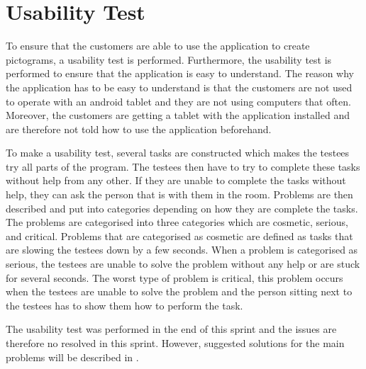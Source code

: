 \section{Usability Test}\label{sec:usability-test}
To ensure that the customers are able to use the application to create pictograms, a usability test is performed.
Furthermore, the usability test is performed to ensure that the application is easy to understand.
The reason why the application has to be easy to understand is that the customers are not used to operate with an android tablet and they are not using computers that often.
Moreover, the customers are getting a tablet with the application installed and are therefore not told how to use the application beforehand.

To make a usability test, several tasks are constructed which makes the testees try all parts of the program. 
The testees then have to try to complete these tasks without help from any other.
If they are unable to complete the tasks without help, they can ask the person that is with them in the room.
Problems are then described and put into categories depending on how they are complete the tasks.
The problems are categorised into three categories which are cosmetic, serious, and critical.
Problems that are categorised as cosmetic are defined as tasks that are slowing the testees down by a few seconds.
When a problem is categorised as serious, the testees are unable to solve the problem without any help or are stuck for several seconds.
The worst type of problem is critical, this problem occurs when the testees are unable to solve the problem and the person sitting next to the testees has to show them how to perform the task.

The usability test was performed in the end of this sprint and the issues are therefore no resolved in this sprint.
However, suggested solutions for the main problems will be described in .

